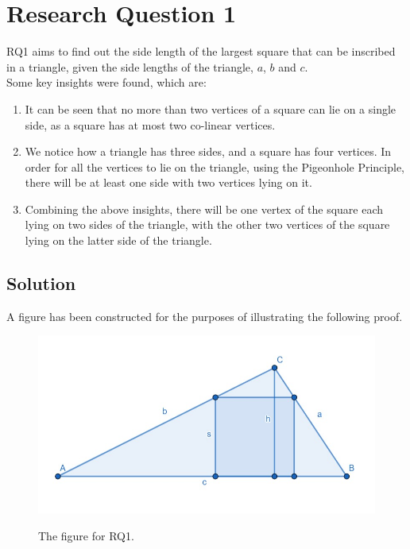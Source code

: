 \documentclass[12pt]{scrartcl}
\begin{document}
\clearpage

\section{Research Question 1}

RQ1 aims to find out the side length of the largest
square that can be inscribed in a triangle, given the side lengths of the triangle, $a$, $b$ and $c$. \\

Some key insights were found, which are: 
\begin{enumerate}
	\item It can be seen that no more than two vertices of a square can lie on a single side,
	      as a square has at most two co-linear vertices.
	\item We notice how a triangle has three sides, and a square has four vertices.
	      In order for all the vertices to lie on the triangle, using the Pigeonhole Principle,
	      there will be at least one side with two vertices lying on it.
	\item Combining the above insights, there will be one vertex of the square
	      each lying on two sides of the triangle, with the other two vertices of the square
	      lying on the latter side of the triangle.
\end{enumerate}

\clearpage

\subsection{Solution}
A figure has been constructed for the purposes of illustrating the following proof.
\begin{figure}[h!]
	\centering
	\includegraphics[scale=.75]{images/rq1.jpg}
	\label{fig:rq1_img}
	\caption{The figure for RQ1.}
\end{figure}
\end{document}

